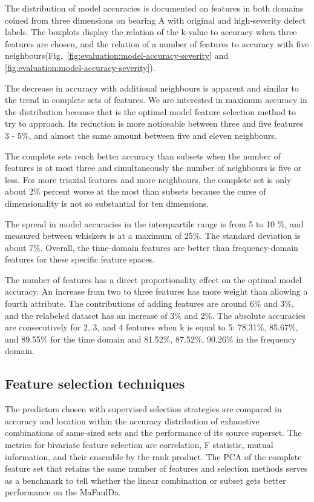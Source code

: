 The distribution of model accuracies is documented on features in both domains coined from three dimensions on bearing A with original and high-severity defect labels. The boxplots display the relation of the k-value to accuracy when three features are chosen, and the relation of a number of features to accuracy with five neighbours(Fig.~\ref{fig:evaluation:model-accuracy-severity} and \ref{fig:evaluation:model-accuracy-severity}).

The decrease in accuracy with additional neighbours is apparent and similar to the trend in complete sets of features. We are interested in maximum accuracy in the distribution because that is the optimal model feature selection method to try to approach. Its reduction is more noticeable between three and five features 3 - 5\%, and almost the same amount between five and eleven neighbours. 

The complete sets reach better accuracy than subsets when the number of features is at most three and simultaneously the number of neighbours is five or less. For more triaxial features and more neighbours, the complete set is only about 2\% percent worse at the most than subsets because the curse of dimensionality is not so substantial for ten dimensions.

The spread in model accuracies in the interquartile range is from 5 to 10 \%, and measured between whiskers is at a maximum of 25\%. The standard deviation is about 7\%. Overall, the time-domain features are better than frequency-domain features for these specific feature spaces.

The number of features has a direct proportionality effect on the optimal model accuracy. An increase from two to three features has more weight than allowing a fourth attribute. The contributions of adding features are around 6\% and 3\%, and the relabeled dataset has an increase of 3\% and 2\%. The absolute accuracies are consecutively for 2, 3, and 4 features when k is equal to 5: 78.31\%, 85.67\%, and 89.55\% for the time domain and 81.52\%, 87.52\%, 90.26\% in the frequency domain.


\subsection{Feature selection techniques}
The predictors chosen with supervised selection strategies are compared in accuracy and location within the accuracy distribution of exhaustive combinations of same-sized sets and the performance of its source superset. The metrics for bivariate feature selection are correlation, F statistic, mutual information, and their ensemble by the rank product. The PCA of the complete feature set that retains the same number of features and selection methods serves as a benchmark to tell whether the linear combination or subset gets better performance on the MaFaulDa.

